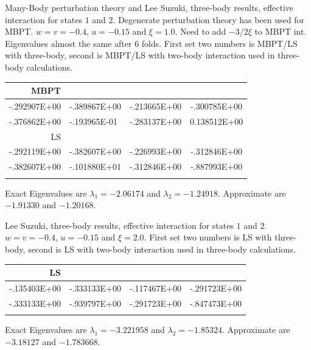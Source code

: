 Many-Body perturbation theory and Lee Suzuki, three-body results, effective interaction
for states $1$ and $2$. Degenerate perturbation theory has been used for MBPT.
$w=v=-0.4$, $u=-0.15$ and $\xi=1.0$. Need to add $-3/2\xi$ to MBPT int.  Eigenvalues almost the same
after 6 folds.
First set two numbers is MBPT/LS with three-body, second is MBPT/LS
with two-body interaction used in three-body calculations.
\begin{center}
\begin{tabular}{rlrc}\\\hline
MBPT& & & \\ \hline
-.292907E+00& -.389867E+00 & -.213665E+00& -.300785E+00\\
-.376862E+00& -.193965E-01 &-.283137E+00  & 0.138512E+00\\
LS& & & \\ \hline
-.292119E+00  &  -.382607E+00 &-.226993E+00  &  -.312846E+00 \\
-.382607E+00  &  -.101880E+01 & -.312846E+00 &   -.887993E+00 \\
& &  & \\ \hline
\end{tabular} 
\end{center} 
Exact Eigenvalues are $\lambda_1=-2.06174$  and $\lambda_2=-1.24918$. Approximate are 
$-1.91330$ and $-1.20168$.

Lee Suzuki, three-body results, effective interaction
for states $1$ and $2$. 
$w=v=-0.4$, $u=-0.15$ and $\xi=2.0$. 
First set two numbers is LS with three-body, second is LS
with two-body interaction used in three-body calculations.
\begin{center}
\begin{tabular}{rlrc}\\\hline
LS& & & \\ \hline
-.135403E+00 &   -.333133E+00 & -.117467E+00  &  -.291723E+00\\
-.333133E+00  &  -.939797E+00&  -.291723E+00  &  -.847473E+00  \\
& &  & \\ \hline
\end{tabular} 
\end{center} 
Exact Eigenvalues are $\lambda_1=-3.221958$  and $\lambda_2=-1.85324$. Approximate are 
$-3.18127$ and $-1.783668$.

